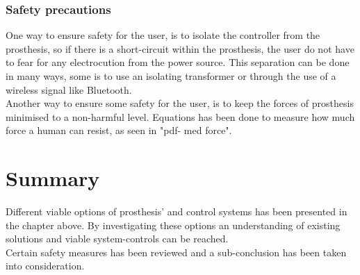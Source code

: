 \subsubsection*{Safety precautions}

One way to ensure safety for the user, is to isolate the controller from the prosthesis, so if there is a short-circuit within the prosthesis, the user do not have to fear for any electrocution from the power source. This separation can be done in many ways, some is to use an isolating transformer\cite{isotrans} or through the use of a wireless signal like Bluetooth.  \\
Another way to ensure some safety for the user, is to keep the forces of prosthesis minimised to a non-harmful level. Equations has been done to measure how much force a human can resist, as seen in "pdf- med force".\\  

\section{Summary} %
Different viable options of prosthesis' and control systems has been presented in the chapter above. By investigating these options an understanding of existing solutions and viable system-controls can be reached.\\
Certain safety measures has been reviewed and a sub-conclusion has been taken into consideration. 